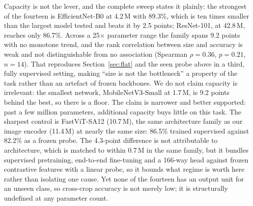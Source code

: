 \documentclass[a4paper,fleqn]{cas-dc}
\begin{document}
Capacity is not the lever, and the complete sweep states it plainly: the strongest of the fourteen is
EfficientNet-B0 at 4.2\,M with 89.3\%, which is ten times smaller than the largest model tested and
beats it by 2.5 points; ResNet-101, at 42.8\,M, reaches only 86.7\%. Across a 25$\times$ parameter
range the family spans 9.2 points with no monotone trend, and the rank correlation between size and
accuracy is weak and not distinguishable from no association (Spearman $\rho = 0.36$, $p = 0.21$, $n = 14$). That reproduces Section~\ref{sec:flat} and the seen probe
above in a third, fully supervised setting, making ``size is not the bottleneck'' a property of the
task rather than an artefact of frozen backbones. We do not claim capacity is irrelevant: the
smallest network, MobileNetV3-Small at 1.7\,M, is 9.2 points behind the best, so there is a floor.
The claim is narrower and better supported: past a few million parameters, additional capacity
buys little on this task. The sharpest control is FastViT-SA12 (10.7\,M), the same architecture
family as our image encoder (11.4\,M) at nearly the same size: 86.5\% trained supervised against
82.2\% as a frozen probe. The 4.3-point difference is not attributable to architecture, which is matched to within 0.7\,M in the same family, but it bundles supervised pretraining, end-to-end fine-tuning and a 166-way head against frozen contrastive features with a linear probe, so it bounds what regime is worth here rather than isolating one cause. Yet none
of the fourteen has an output unit for an unseen class, so cross-crop accuracy is not merely low;
it is structurally undefined at any parameter count.
\end{document}
